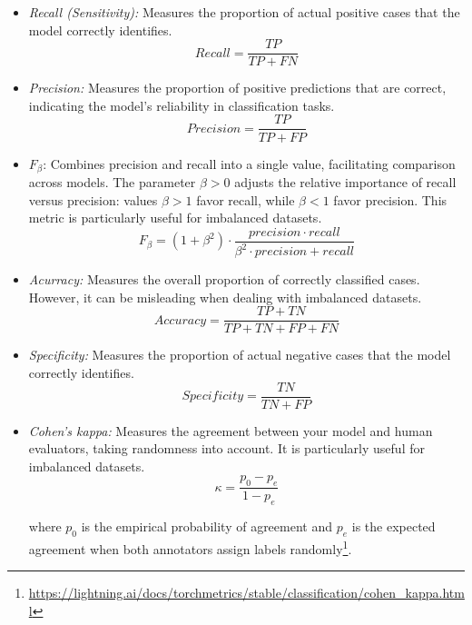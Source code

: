 \documentclass[lettersize,journal]{IEEEtran}
\begin{document}
\begin{itemize}
Where $TP$ denotes true positives, $TN$ true negatives, $FP$ false positives, and $FN$ false negatives.
\item \textit{Recall (Sensitivity):} Measures the proportion of actual positive cases that the model correctly identifies.
\begin{equation}
Recall=\frac{TP}{TP+FN}
\end{equation}
\item \textit{Precision:} Measures the proportion of positive predictions that are correct, indicating the model’s reliability in classification tasks.
\begin{equation}
Precision=\frac{TP}{TP+FP}
\end{equation}
\item $F_\beta$: Combines precision and recall into a single value, facilitating comparison across models. The parameter $\beta > 0$ adjusts the relative importance of recall versus precision: values $\beta>1$ favor recall, while $\beta<1$ favor precision. This metric is particularly useful for imbalanced datasets.
\begin{equation}
F_\beta=(1+\beta^2)\cdot \frac{precision\cdot recall}{\beta^2 \cdot precision+recall}
\end{equation}
\item \textit{Acurracy:} Measures the overall proportion of correctly classified cases. However, it can be misleading when dealing with imbalanced datasets.
\begin{equation}
Accuracy=\frac{TP+TN}{TP+TN+FP+FN}
\end{equation}
\item \textit{Specificity:} Measures the proportion of actual negative cases that the model correctly identifies.
\begin{equation}
Specificity=\frac{TN}{TN+FP}
\end{equation}
\item \textit{Cohen’s kappa:} Measures the agreement between your model and human evaluators, taking randomness into account. It is particularly useful for imbalanced datasets.
\begin{equation}
\kappa = \frac{p_0-p_e}{1-p_e}
\end{equation}

where $p_0$ is the empirical probability of agreement and $p_e$ is the expected agreement when both annotators assign labels randomly\footnote{\href{https://lightning.ai/docs/torchmetrics/stable/classification/cohen_kappa.html}{https://lightning.ai/docs/torchmetrics/stable/classification/cohen\_kappa.html}}.
\end{itemize}
\end{document}
